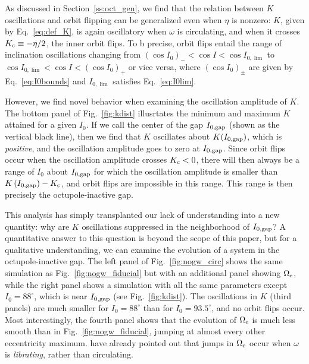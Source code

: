 \documentclass[
        fleqn,
        usenatbib,
    ]{mnras}
\newcommand*{\p}[1]{\left(#1\right)}
\begin{document}
As discussed in Section~\ref{ss:oct_gen}, we find that the relation between $K$
oscillations and orbit flipping can be generalized even when $\eta$ is nonzero:
$K$, given by Eq.~\eqref{eq:def_K}, is again oscillatory when $\omega$ is
circulating, and when it crosses $K_{\rm c} \equiv -\eta / 2$, the inner orbit
flips. To b precise, orbit flips entail the range of inclination oscillations
changing from $\p{\cos I_0}_- < \cos I < \cos I_{0, \lim}$ to $\cos I_{0, \lim}
< \cos I < \p{\cos I_0}_+$ or vice versa, where $\p{\cos I_0}_{\pm}$ are given
by Eq.~\eqref{eq:I0bounds} and $I_{0, \lim}$ satisfies Eq.~\eqref{eq:I0lim}.

However, we find novel behavior when examining the oscillation amplitude of $K$.
The bottom panel of Fig.~\ref{fig:kdist} illusrtates the minimum and maximum $K$
attained for a given $I_0$. If we call the center of the gap $I_{\rm 0, gap}$
(shown as the vertical black line), then we find that $K$ oscillates about
$K(I_{\rm 0, gap})$, which is \emph{positive}, and the oscillation amplitude
goes to zero at $I_{\rm 0, gap}$. Since orbit flips occur when the oscillation
amplitude crosses $K_{\rm c} < 0$, there will then always be a range of $I_0$
about $I_{\rm 0, gap}$ for which the oscillation amplitude is smaller than
$K\p{I_{\rm 0, gap}} - K_{\rm c}$, and orbit flips are impossible in this range.
This range is then precisely the octupole-inactive gap.

This analysis has simply transplanted our lack of understanding into a new
quantity: why are $K$ oscillations suppressed in the neighborhood of $I_{\rm
0, gap}$? A quantitative answer to this question is beyond the scope of this
paper, but for a qualitative understanding, we can examine the evolution of a
system in the octupole-inactive gap. The left panel of Fig.~\ref{fig:nogw_circ}
shows the same simulation as Fig.~\ref{fig:nogw_fiducial} but with an additional
panel showing $\Omega_{\rm e}$, while the right panel shows a simulation with
all the same parameters except $I_0 = 88^\circ$, which is near $I_{\rm 0, gap}$
(see Fig.~\ref{fig:kdist}). The oscillations in $K$ (third panels) are much
smaller for $I_0 = 88^\circ$ than for $I_0 = 93.5^\circ$, and no orbit flips
occur. Most interestingly, the fourth panel shows that the evolution of
$\Omega_{\rm e}$ is much less smooth than in Fig.~\ref{fig:nogw_fiducial},
jumping at almost every other eccentricity maximum. \citet{katz2011long} have
already pointed out that jumps in $\Omega_{\rm e}$ occur when $\omega$ is
\emph{librating}, rather than circulating.
\end{document}

